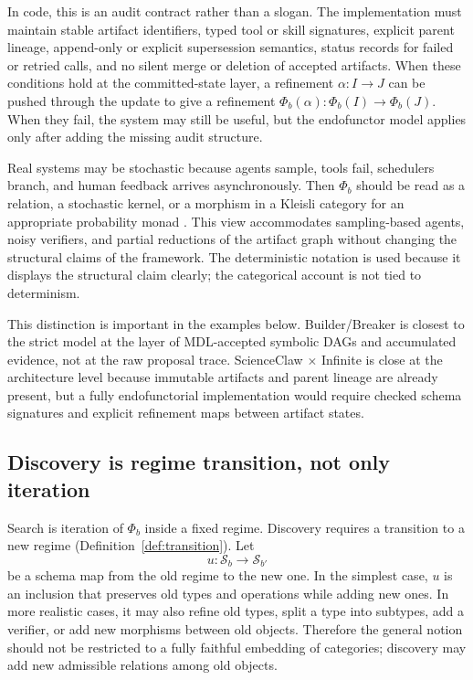 \documentclass[11pt]{article}
\theoremstyle{definition}
\newcommand{\Sschema}{\mathcal{S}}
\begin{document}
In code, this is an audit contract rather than a slogan. The implementation must maintain stable artifact identifiers, typed tool or skill signatures, explicit parent lineage, append-only or explicit supersession semantics, status records for failed or retried calls, and no silent merge or deletion of accepted artifacts. When these conditions hold at the committed-state layer, a refinement $\alpha:I\to J$ can be pushed through the update to give a refinement $\Phi_b(\alpha):\Phi_b(I)\to\Phi_b(J)$. When they fail, the system may still be useful, but the endofunctor model applies only after adding the missing audit structure.

Real systems may be stochastic because agents sample, tools fail, schedulers branch, and human feedback arrives asynchronously. Then $\Phi_b$ should be read as a relation, a stochastic kernel, or a morphism in a Kleisli category for an appropriate probability monad \citep{moggi_monads_1991}. This view accommodates sampling-based agents, noisy verifiers, and partial reductions of the artifact graph without changing the structural claims of the framework. The deterministic notation is used because it displays the structural claim clearly; the categorical account is not tied to determinism.

This distinction is important in the examples below. Builder/Breaker is closest to the strict model at the layer of MDL-accepted symbolic DAGs and accumulated evidence, not at the raw proposal trace. ScienceClaw $\times$ Infinite is close at the architecture level because immutable artifacts and parent lineage are already present, but a fully endofunctorial implementation would require checked schema signatures and explicit refinement maps between artifact states.

\subsection{Discovery is regime transition, not only iteration}

\label{sec:regime_enlargement_results}

Search is iteration of $\Phi_b$ inside a fixed regime. Discovery requires a transition to a new regime (Definition~\ref{def:transition}). Let
\begin{equation}
u:\Sschema_b\longrightarrow \Sschema_{b'}
\label{eq:schema_extension}
\end{equation}
be a schema map from the old regime to the new one. In the simplest case, $u$ is an inclusion that preserves old types and operations while adding new ones. In more realistic cases, it may also refine old types, split a type into subtypes, add a verifier, or add new morphisms between old objects. Therefore the general notion should not be restricted to a fully faithful embedding of categories; discovery may add new admissible relations among old objects.
\end{document}
